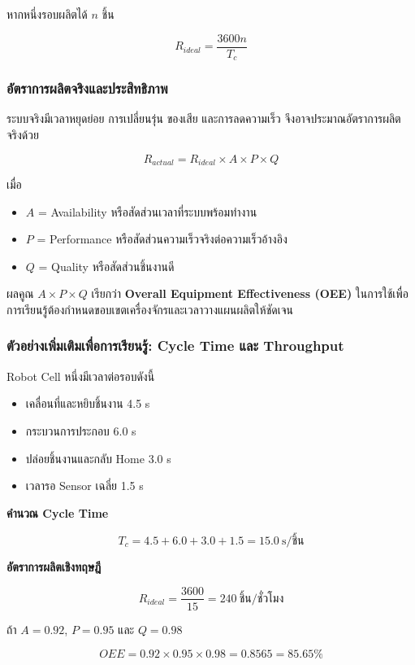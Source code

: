 หากหนึ่งรอบผลิตได้ $n$ ชิ้น

\[
R_{ideal}=\frac{3600n}{T_c}
\]

\subsubsection{อัตราการผลิตจริงและประสิทธิภาพ}

ระบบจริงมีเวลาหยุดย่อย การเปลี่ยนรุ่น ของเสีย และการลดความเร็ว จึงอาจประมาณอัตราการผลิตจริงด้วย

\[
R_{actual}=R_{ideal}\times A\times P\times Q
\]

เมื่อ

\begin{itemize}
    \item $A$ = Availability หรือสัดส่วนเวลาที่ระบบพร้อมทำงาน
    \item $P$ = Performance หรือสัดส่วนความเร็วจริงต่อความเร็วอ้างอิง
    \item $Q$ = Quality หรือสัดส่วนชิ้นงานดี
\end{itemize}

ผลคูณ $A\times P\times Q$ เรียกว่า \textbf{Overall Equipment Effectiveness (OEE)} ในการใช้เพื่อการเรียนรู้ต้องกำหนดขอบเขตเครื่องจักรและเวลาวางแผนผลิตให้ชัดเจน

\subsubsection{ตัวอย่างเพิ่มเติมเพื่อการเรียนรู้: Cycle Time และ Throughput}

Robot Cell หนึ่งมีเวลาต่อรอบดังนี้

\begin{itemize}
    \item เคลื่อนที่และหยิบชิ้นงาน 4.5 s
    \item กระบวนการประกอบ 6.0 s
    \item ปล่อยชิ้นงานและกลับ Home 3.0 s
    \item เวลารอ Sensor เฉลี่ย 1.5 s
\end{itemize}

\textbf{คำนวณ Cycle Time}

\[
T_c=4.5+6.0+3.0+1.5=15.0\ \text{s/ชิ้น}
\]

\textbf{อัตราการผลิตเชิงทฤษฎี}

\[
R_{ideal}=\frac{3600}{15}=240\ \text{ชิ้น/ชั่วโมง}
\]

ถ้า $A=0.92$, $P=0.95$ และ $Q=0.98$

\[
OEE=0.92\times0.95\times0.98=0.8565=85.65\%
\]

